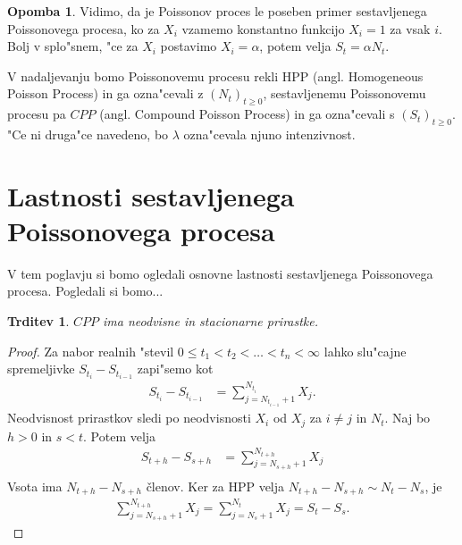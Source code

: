 \documentclass[12pt, a4paper, reqno]{amsart}
\theoremstyle{definition} %
\newtheorem{opomba}[definicija]{Opomba}
\theoremstyle{plain} %
\newtheorem{trditev}[definicija]{Trditev}
\newcommand{\1}{\mathds{1}}
\begin{document}
    \begin{opomba}
        Vidimo, da je Poissonov proces le poseben primer sestavljenega Poissonovega procesa, ko za
        $X_i$ vzamemo konstantno funkcijo $X_i = 1$ za vsak $i$. Bolj v splo"snem, "ce za $X_i$ 
        postavimo $X_i = \alpha$, potem velja $S_t = \alpha N_t$.
        \label{op:CPPHPPPovezava}
    \end{opomba}

    V nadaljevanju bomo Poissonovemu procesu rekli HPP (angl. Homogeneous Poisson Process) in ga
    ozna"cevali z $(N_t)_{t\geq0}$, sestavljenemu Poissonovemu procesu pa $CPP$ (angl. Compound Poisson 
    Process) in ga ozna"cevali s $(S_t)_{t\geq0}$. "Ce ni druga"ce navedeno, bo $\lambda$ ozna"cevala
    njuno intenzivnost.

\section{Lastnosti sestavljenega Poissonovega procesa}

    V tem poglavju si bomo ogledali osnovne lastnosti sestavljenega Poissonovega procesa. Pogledali
    si bomo... 
    \begin{trditev}
        $CPP$ ima neodvisne in stacionarne prirastke.
        \label{trd:neodvPrirCPP}
    \end{trditev}

    \begin{proof}
        Za nabor realnih "stevil $0 \leq t_1 < t_2 < \ldots < t_n < \infty$ lahko slu"cajne
        spremeljivke $S_{t_i} - S_{t_{i-1}}$ zapi"semo kot
        \begin{align*}
            S_{t_i} - S_{t_{i-1}} &= \sum_{j=N_{t_{i-1}}+1}^{N_{t_i}} X_j. 
        \end{align*}
        Neodvisnost prirastkov sledi po neodvisnosti $X_i$ od $X_j$ za $i\neq j$ in $N_t$. 
        Naj bo $h > 0$ in $s < t$. Potem velja
        \begin{align*}
            S_{t+h} - S_{s+h} &= \sum_{j=N_{s+h}+1}^{N_{t+h}} X_j \\
        \end{align*}
        Vsota ima $N_{t+h} - N_{s+h}$ členov. Ker za HPP velja 
        $N_{t+h} - N_{s+h} \sim N_t - N_s$, je 
        \begin{align*}
            \sum_{j=N_{s+h}+1}^{N_{t+h}} X_j = \sum_{j=N_{s}+1}^{N_{t}} X_j = S_t - S_s.
        \end{align*}
    \end{proof}
\end{document}
